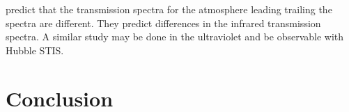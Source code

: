 \documentclass[manuscript]{aastex}
\begin{document}
\citet{fortney} predict that the transmission spectra for the atmosphere leading trailing the spectra are different. They predict differences in the infrared transmission spectra. A similar study may be done in the ultraviolet and be observable with Hubble STIS.

\section{Conclusion}


  
\end{document}
